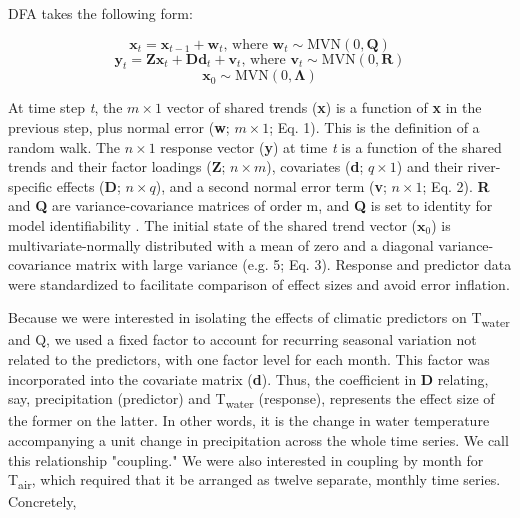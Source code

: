 \documentclass[notitlepage]{article}
\begin{document}
DFA takes the following form:

\begin{equation}
    \textbf{x}_t = \textbf{x}_{t-1} + \textbf{w}_t\textrm{, where } \textbf{w}_t \sim \textrm{MVN}(0,\textbf{Q})
\end{equation}
\begin{equation}
    \textbf{y}_t = \textbf{Zx}_t + \textbf{Dd}_t + \textbf{v}_t\textrm{, where } \textbf{v}_t \sim \textrm{MVN}(0,\textbf{R})
\end{equation}
\begin{equation}
    \textbf{x}_0 \sim \textrm{MVN}(0,\bm{\Lambda})
\end{equation}

At time step {\it t}, the $m \times 1$ vector of shared trends (\textbf{x}) is a function of \textbf{x} in the previous step, plus normal error (\textbf{w}; $m\times 1$; Eq. 1). This is the definition of a random walk. The $n\times 1$ response vector (\textbf{y}) at time {\it t} is a function of the shared trends and their factor loadings (\textbf{Z}; $n\times m$), covariates (\textbf{d}; $q\times 1$) and their river-specific effects (\textbf{D}; $n\times q$), and a second normal error term (\textbf{v}; $n\times 1$; Eq. 2). \textbf{R} and \textbf{Q} are variance-covariance matrices of order m, and \textbf{Q} is set to identity for model identifiability \citep{harvey1990forecasting}. The initial state of the shared trend vector ($\bm{x}_0$) is multivariate-normally distributed with a mean of zero and a diagonal variance-covariance matrix with large variance (e.g. 5; Eq. 3). Response and predictor data were standardized to facilitate comparison of effect sizes and avoid error inflation.


Because we were interested in isolating the effects of climatic predictors on T\textsubscript{water} and Q, we used a fixed factor to account for recurring seasonal variation not related to the predictors, with one factor level for each month. This factor was incorporated into the covariate matrix (\textbf{d}). Thus, the coefficient in \textbf{D} relating, say, precipitation (predictor) and T\textsubscript{water} (response), represents the effect size of the former on the latter. In other words, it is the change in water temperature accompanying a unit change in precipitation across the whole time series. We call this relationship "coupling." We were also interested in coupling by month for T\textsubscript{air}, which required that it be arranged as twelve separate, monthly time series. Concretely,
\end{document}
